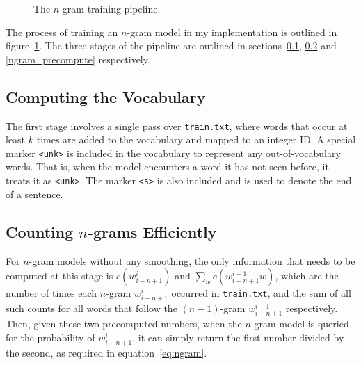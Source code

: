 \documentclass[a4paper, 12pt]{report}
\newcommand{\ttt}[1]{\texttt{#1}}
\begin{document}
\begin{figure}[h]
\captionsetup{justification=centering}
\centering
{}
\caption{The $n$-gram training pipeline.}
\label{fig:ngram_training}
\end{figure}

The process of training an $n$-gram model in my implementation is outlined in figure~\ref{fig:ngram_training}. The three stages of the pipeline are outlined in sections~\ref{ngram_compute_vocab}, \ref{ngram_count} and \ref{ngram_precompute} respectively.

\subsection{Computing the Vocabulary} \label{ngram_compute_vocab}

The first stage involves a single pass over \ttt{train.txt}, where words that occur at least $k$ times are added to the vocabulary and mapped to an integer ID. A special marker \ttt{<unk>} is included in the vocabulary to represent any out-of-vocabulary words. That is, when the model encounters a word it has not seen before, it treats it as \ttt{<unk>}. The marker \ttt{<s>} is also included and is used to denote the end of a sentence.

\subsection{Counting $n$-grams Efficiently} \label{ngram_count}

For $n$-gram models without any smoothing, the only information that needs to be computed at this stage is $c(w_{i - n + 1}^{i})$ and $\sum_w c(w_{i - n + 1}^{i - 1}w)$, which are the number of times each $n$-gram $w_{i - n + 1}^i$ occurred in \ttt{train.txt}, and the sum of all such counts for all words that follow the $(n-1)$-gram $w_{i - n + 1}^{i - 1}$ respectively. Then, given these two precomputed numbers, when the $n$-gram model is queried for the probability of $w_{i - n + 1}^i$, it can simply return the first number divided by the second, as required in equation~\ref{eq:ngram}. \\
\end{document}
